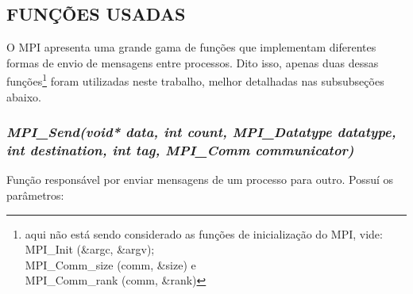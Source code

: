 	\subsection{\normalsize FUNÇÕES USADAS}\label{mpi}
		O MPI apresenta uma grande gama de funções que implementam diferentes formas de envio de mensagens entre processos. Dito isso, apenas duas dessas funções\footnote{aqui não está sendo considerado as funções de inicialização do MPI, vide:\\
		MPI\_Init (\&argc, \&argv);\\
		MPI\_Comm\_size (comm, \&size) e\\
		MPI\_Comm\_rank (comm, \&rank)} foram utilizadas neste trabalho, melhor detalhadas nas subsubseções abaixo.
		
		\subsubsection{\normalsize \textit{MPI\_Send(void* data, int count, MPI\_Datatype datatype, int destination, int tag, MPI\_Comm communicator)}}\label{send}
			Função responsável por enviar mensagens de um processo para outro. Possuí os parâmetros:
